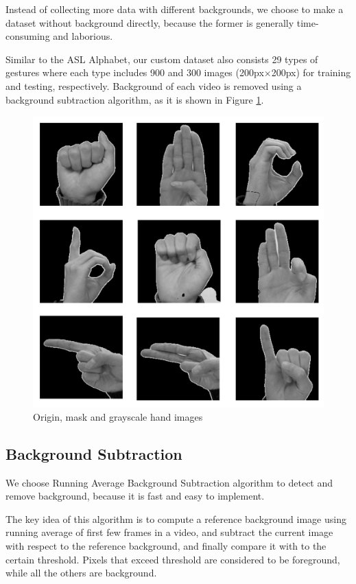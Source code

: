 \documentclass[10pt,twocolumn,letterpaper]{article}
\begin{document}
Instead of collecting more data with different backgrounds, we choose to make a dataset without background directly, because the former is generally time-consuming and laborious.

Similar to the ASL Alphabet, our custom dataset also consists 29 types of gestures where each type includes 900 and 300 images (200px$\times$200px) for training and testing, respectively. Background of each video is removed using a background subtraction algorithm, as it is shown in Figure \ref{fig:dataset}.

\begin{figure}[h]
\begin{center}
\includegraphics[width=0.8\linewidth]{imgs/dataset.png}
\end{center}
   \caption{Origin, mask and grayscale hand images}
\label{fig:dataset}
\end{figure}


\subsection{Background Subtraction}

We choose Running Average Background Subtraction algorithm to detect and remove background, because it is fast and easy to implement.

The key idea of this algorithm is to compute a reference background image using running average of first few frames in a video, and subtract the current image with respect to the reference background, and finally compare it with  to the certain threshold. Pixels that exceed threshold are considered to be foreground, while all the others are background.
 
\end{document}
